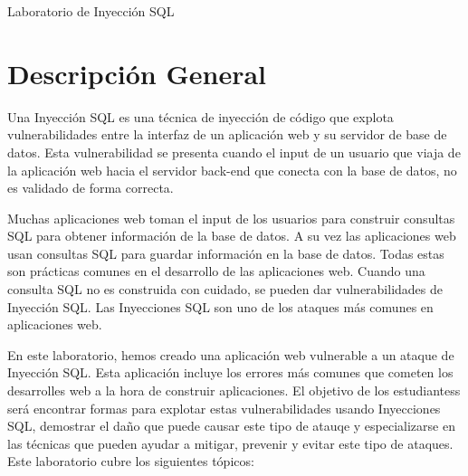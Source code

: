 
\newcommand{\commonfolder}{../../common-files}
\newcommand{\webcommon}{../Web_Common}







\newcommand{\sqlFigs}{./Figs}





\begin{center}
{\LARGE Laboratorio de Inyección SQL }
\end{center}



\section{Descripción General}

Una Inyección SQL es una técnica de inyección de código que explota vulnerabilidades entre la interfaz de un aplicación web y su servidor de base de datos. Esta vulnerabilidad se presenta cuando el input de un usuario que viaja de la aplicación web hacia el servidor back-end que conecta con la base de datos, no es validado de forma correcta.

Muchas aplicaciones web toman el input de los usuarios para construir consultas SQL para obtener información de la base de datos. A su vez las aplicaciones web usan consultas SQL para guardar información en la base de datos. Todas estas son prácticas comunes en el desarrollo de las aplicaciones web. Cuando una consulta SQL no es construida con cuidado, se pueden dar vulnerabilidades de Inyección SQL.
Las Inyecciones SQL son uno de los ataques más comunes en aplicaciones web.

En este laboratorio, hemos creado una aplicación web vulnerable a un ataque de Inyección SQL. Esta aplicación incluye los errores más comunes que cometen los desarrolles web a la hora de construir aplicaciones.
El objetivo de los estudiantess será encontrar formas para explotar estas vulnerabilidades usando Inyecciones SQL, demostrar el daño que puede causar este tipo de atauqe y especializarse en las técnicas que pueden ayudar a mitigar, prevenir y evitar este tipo de ataques.
Este laboratorio cubre los siguientes tópicos:

